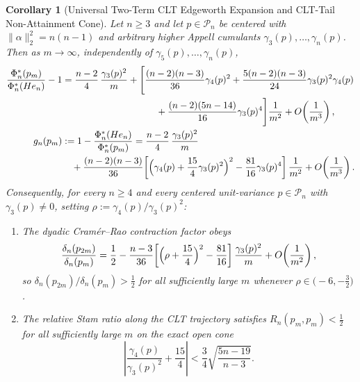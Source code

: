 \documentclass[11pt,a4paper]{article}
\newtheorem{corollary}[theorem]{Corollary}
\theoremstyle{definition}
\begin{document}
\begin{corollary}[Universal Two-Term CLT Edgeworth Expansion and CLT-Tail Non-Attainment Cone]
\label{cor:clt-edgeworth}
Let $n \ge 3$ and let $p \in \mathcal{P}_n$ be centered with $\|\alpha\|_2^2 = n(n-1)$ and arbitrary higher Appell cumulants $\gamma_3(p), \dots, \gamma_n(p)$. Then as $m \to \infty$, independently of $\gamma_5(p), \dots, \gamma_n(p)$,
\begin{align}
\label{eq:clt-two-term-phi}
\frac{\Phi_n^*(p_m)}{\Phi_n^*(He_n)} - 1
&= \frac{n-2}{4}\,\frac{\gamma_3(p)^2}{m}
+ \Biggl[\frac{(n-2)(n-3)}{36}\gamma_4(p)^2
+ \frac{5(n-2)(n-3)}{24}\gamma_3(p)^2\gamma_4(p) \nonumber \\
&\qquad\qquad\qquad\qquad\qquad + \frac{(n-2)(5n-14)}{16}\gamma_3(p)^4\Biggr]\frac{1}{m^2}
+ O\!\left(\frac{1}{m^3}\right), \\
\label{eq:clt-two-term-gn}
g_n(p_m) &:= 1 - \frac{\Phi_n^*(He_n)}{\Phi_n^*(p_m)}
= \frac{n-2}{4}\,\frac{\gamma_3(p)^2}{m} \nonumber \\
&\quad + \frac{(n-2)(n-3)}{36}\!\left[\Bigl(\gamma_4(p) + \frac{15}{4}\gamma_3(p)^2\Bigr)^2 - \frac{81}{16}\gamma_3(p)^4\right]\frac{1}{m^2}
+ O\!\left(\frac{1}{m^3}\right).
\end{align}
Consequently, for every $n \ge 4$ and every centered unit-variance $p \in \mathcal{P}_n$ with $\gamma_3(p) \neq 0$, setting $\rho := \gamma_4(p)/\gamma_3(p)^2$:
\begin{enumerate}
\item[(a)] The dyadic Cram\'er--Rao contraction factor obeys
\[
\frac{\delta_n(p_{2m})}{\delta_n(p_m)}
= \frac{1}{2} - \frac{n-3}{36}\!\left[\Bigl(\rho + \frac{15}{4}\Bigr)^2 - \frac{81}{16}\right]\frac{\gamma_3(p)^2}{m} + O\!\left(\frac{1}{m^2}\right),
\]
so $\delta_n(p_{2m})/\delta_n(p_m) > \frac{1}{2}$ for all sufficiently large $m$ whenever $\rho \in \bigl(-6, -\frac{3}{2}\bigr)$.
\item[(b)] The relative Stam ratio along the CLT trajectory satisfies $R_n(p_m, p_m) < \frac{1}{2}$ for all sufficiently large $m$ on the exact open cone
\[
\left|\frac{\gamma_4(p)}{\gamma_3(p)^2} + \frac{15}{4}\right| < \frac{3}{4}\sqrt{\frac{5n - 19}{n - 3}}.
\]
\end{enumerate}
\end{corollary}
\end{document}
